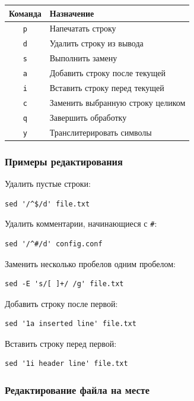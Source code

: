 \documentclass[12pt,a4paper]{article}
\begin{document}
\begin{center}
\begin{tabular}{|c|p{10cm}|}
\hline
Команда & Назначение \\
\hline
\texttt{p} & Напечатать строку \\
\hline
\texttt{d} & Удалить строку из вывода \\
\hline
\texttt{s} & Выполнить замену \\
\hline
\texttt{a} & Добавить строку после текущей \\
\hline
\texttt{i} & Вставить строку перед текущей \\
\hline
\texttt{c} & Заменить выбранную строку целиком \\
\hline
\texttt{q} & Завершить обработку \\
\hline
\texttt{y} & Транслитерировать символы \\
\hline
\end{tabular}
\end{center}

\subsubsection{Примеры редактирования}

Удалить пустые строки:

\begin{verbatim}
sed '/^$/d' file.txt
\end{verbatim}

Удалить комментарии, начинающиеся с \texttt{\#}:

\begin{verbatim}
sed '/^#/d' config.conf
\end{verbatim}

Заменить несколько пробелов одним пробелом:

\begin{verbatim}
sed -E 's/[ ]+/ /g' file.txt
\end{verbatim}

Добавить строку после первой:

\begin{verbatim}
sed '1a inserted line' file.txt
\end{verbatim}

Вставить строку перед первой:

\begin{verbatim}
sed '1i header line' file.txt
\end{verbatim}

\subsubsection{Редактирование файла на месте}
\end{document}
